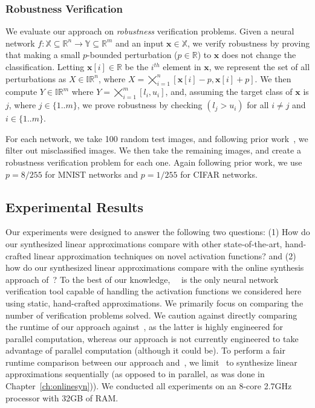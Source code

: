 \subsubsection{Robustness Verification}
We evaluate our approach on \textit{robustness} verification problems. Given a
neural network $ f: \mathbb{X} \subseteq \mathbb{R}^n \to \mathbb{Y} \subseteq
\mathbb{R}^m $ and an input $ \mathbf{x} \in \mathbb{X} $, we verify robustness
by proving that making a small $ p $-bounded perturbation ($ p \in \mathbb{R}
$) to $ \mathbf{x} $ does not change the classification. Letting $
\mathbf{x}[i] \in \mathbb{R} $ be the $ i^{th} $ element in $ \mathbf{x} $, we
represent the set of all perturbations as $ X \in \mathbb{IR}^n $, where $ X =
\bigtimes_{i=1}^n [\mathbf{x}[i] - p, \mathbf{x}[i] + p] $. We then compute $ Y
\in \mathbb{IR}^m $ where $ Y = \bigtimes_{i=1}^m [l_i,
u_i] $, and, assuming the target class of $ \mathbf{x} $ is $ j $, where $ j \in
\{1..m\} $, we prove robustness by checking $ (l_j > u_i)$ for all $i \neq j$ and $i \in
\{1..m\} $.

For each network, we take 100 random test images, and following prior
work~\cite{GehrMDTCV18}, we filter out misclassified images. We then take
the remaining images, and create a robustness verification problem for each
one. Again following prior work, we use $ p = 8/255 $ for MNIST networks
and $ p = 1/255 $ for CIFAR networks.

\subsection{Experimental Results}

Our experiments were designed to answer the following two questions: (1) How do
our
synthesized linear approximations compare with other state-of-the-art,
hand-crafted linear approximation techniques on novel activation functions? and
(2) how do our synthesized linear approximations compare with the online
synthesis approach of~\linsyn{}?
%
To the best of our
knowledge,~\autolipra{}~\cite{autolipra} is the only neural network
verification tool capable of handling the activation functions we considered here
using static, hand-crafted approximations.
%
We primarily focus on comparing the number of verification problems solved.
%
We caution against directly comparing the runtime of our approach
against~\autolipra{}, as the latter is highly engineered for parallel computation,
whereas our approach is not currently engineered to take advantage of parallel
computation (although it could be).
%
To perform a fair runtime comparison between our approach and~\linsyn{}, we
limit~\linsyn{} to synthesize linear approximations sequentially (as opposed to
in parallel, as was done in Chapter~\ref{ch:onlinesyn})).
%
We conducted all experiments on an 8-core 2.7GHz processor with 32GB of RAM.


